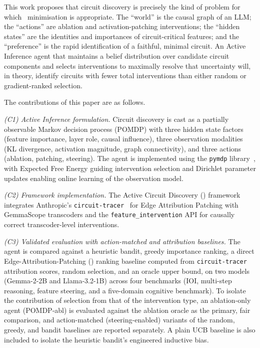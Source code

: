 This work proposes that circuit discovery is precisely the kind of problem for which
\EFE\ minimisation is appropriate. The ``world'' is the causal graph of an LLM; the
``actions'' are ablation and activation-patching interventions; the ``hidden states''
are the identities and importances of circuit-critical features; and the ``preference''
is the rapid identification of a faithful, minimal circuit. An Active Inference agent
that maintains a belief distribution over candidate circuit components and selects
interventions to maximally resolve that uncertainty will, in theory, identify circuits
with fewer total interventions than either random or gradient-ranked selection.

The contributions of this paper are as follows.

\emph{(C1) Active Inference formulation.} Circuit discovery is cast as a
partially observable Markov decision process (POMDP) with three hidden state
factors (feature importance, layer role, causal influence), three observation
modalities (KL divergence, activation magnitude, graph connectivity), and three
actions (ablation, patching, steering). The agent is implemented using the
\texttt{pymdp} library~\cite{Pymdp2022}, with Expected Free Energy guiding
intervention selection and Dirichlet parameter updates enabling online learning
of the observation model.

\emph{(C2) Framework implementation.} The Active Circuit Discovery (\ACD)
framework integrates Anthropic's
\texttt{circuit-tracer}~\cite{Anthropic2025CT,Ameisen2025} for Edge Attribution Patching
with GemmaScope transcoders and the \texttt{feature\_intervention} API for
causally correct transcoder-level interventions.

\emph{(C3) Validated evaluation with action-matched and attribution baselines.}
The agent is compared against a heuristic bandit, greedy importance ranking, a
direct Edge-Attribution-Patching (\EAP) ranking baseline computed from
\texttt{circuit-tracer} attribution scores, random selection, and an oracle upper
bound, on two models (Gemma-2-2B and Llama-3.2-1B) across four benchmarks (IOI,
multi-step reasoning, feature steering, and a five-domain cognitive benchmark).
To isolate the contribution of selection from that of the intervention
type, an ablation-only agent (POMDP-abl) is evaluated against the ablation
oracle as the primary, fair comparison, and action-matched
(steering-enabled) variants of the random, greedy, and bandit baselines are reported
separately. A plain UCB baseline is also included to isolate the heuristic bandit's
engineered inductive bias.

